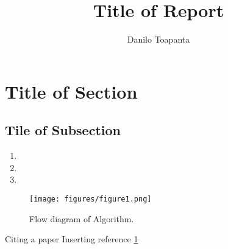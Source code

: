 \documentclass[a4paper,10pt]{article}
\title{Title of Report}
\author{Danilo Toapanta}
\begin{document}
\selectfont{}

\maketitle

\section{Title of Section}

\subsection{Tile of Subsection}

\begin{enumerate}
 \item 
 \item 
 \item 
\end{enumerate}

\begin{figure}[hbt]
\centering
    \texttt{[image: figures/figure1.png]}
    \caption{Flow diagram of Algorithm.}
    \label{flowChart}
\end{figure}

Citing a paper \cite{DanilosEssay}
Inserting reference \ref{flowChart} 

\clearpage
\renewcommand*{\bibfont}{\small}
\printbibliography
\end{document}
